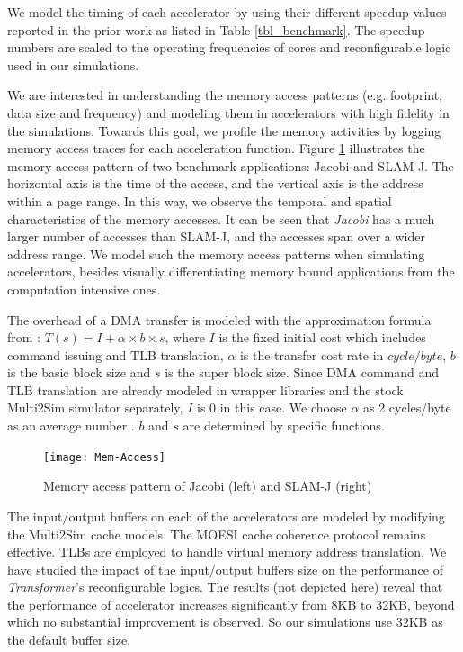 We model the timing of each accelerator by using their different
speedup values reported in the prior work as listed in Table
\ref{tbl_benchmark}. The speedup numbers are scaled to the 
operating frequencies of cores and reconfigurable logic used in our
simulations. 

We are interested in understanding the memory access
patterns (e.g. footprint, data size and frequency) and modeling
them in accelerators with high fidelity in the simulations. Towards this goal, we profile the memory
activities by logging memory access traces for each 
acceleration function.
Figure \ref{fig_mem_access} illustrates the memory access pattern of
two benchmark applications: Jacobi and SLAM-J. The horizontal axis is
the time of the access, and the vertical axis is the address within a
page range. In this way, we observe the temporal and spatial
characteristics of the memory accesses. It can be seen that {\em
  Jacobi} has a much larger number of  accesses than SLAM-J, and the
accesses span over a wider address range. We model such the memory
access patterns when simulating accelerators, besides visually
differentiating memory bound applications from the computation intensive
ones. 

The overhead of a DMA transfer is modeled with the approximation
formula from \cite{Saidi:2012}: $ T(s) = I + \alpha \times b \times
s$, where $I$ is the fixed initial cost which includes command issuing
and TLB translation, $\alpha$ is the transfer cost rate in
$cycle/byte$, $b$ is the basic block size and $s$ is the super block
size. Since DMA command and TLB translation are already modeled in wrapper libraries and the
stock Multi2Sim simulator separately, $I$ is 0 in this case. We choose $\alpha$
as 2 cycles/byte as an average number \cite{Saidi:2012}. $b$ and $s$
are determined by specific functions.


\begin{figure}
    \centering
    \texttt{[image: Mem-Access]}
	\caption{Memory access pattern of Jacobi (left) and SLAM-J (right)}
\label{fig_mem_access}
\end{figure}


The input/output buffers on each of the accelerators are modeled by
modifying the Multi2Sim cache models. The MOESI cache coherence
protocol remains effective. TLBs are employed to handle virtual memory
address translation.  We have studied the impact of the input/output
buffers size on the performance of {\em Transformer}'s reconfigurable
logics. The results (not depicted here) reveal that the performance of
accelerator increases significantly from 8KB to 32KB, beyond which no
substantial improvement is observed. So our simulations use 32KB as
the default buffer size.

